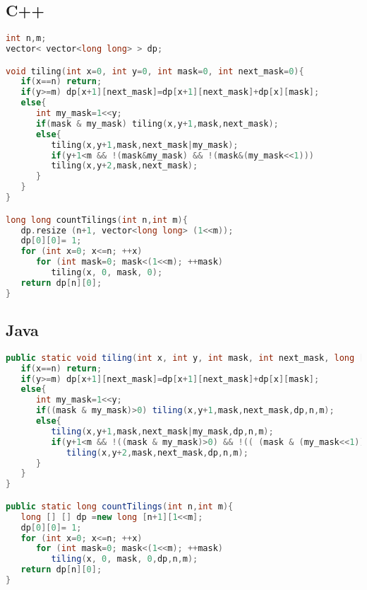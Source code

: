 \subsection{C++}
\begin{lstlisting}[language=C++]
int n,m;
vector< vector<long long> > dp;

void tiling(int x=0, int y=0, int mask=0, int next_mask=0){
   if(x==n) return;
   if(y>=m) dp[x+1][next_mask]=dp[x+1][next_mask]+dp[x][mask];
   else{
      int my_mask=1<<y;
      if(mask & my_mask) tiling(x,y+1,mask,next_mask);
      else{
         tiling(x,y+1,mask,next_mask|my_mask);
         if(y+1<m && !(mask&my_mask) && !(mask&(my_mask<<1)))
         tiling(x,y+2,mask,next_mask);
      }
   }
}

long long countTilings(int n,int m){
   dp.resize (n+1, vector<long long> (1<<m));
   dp[0][0]= 1;
   for (int x=0; x<=n; ++x)
      for (int mask=0; mask<(1<<m); ++mask)
         tiling(x, 0, mask, 0);
   return dp[n][0];
}
\end{lstlisting}
\subsection{Java}
\begin{lstlisting}[language=Java]
public static void tiling(int x, int y, int mask, int next_mask, long [] [] dp,int n,int m){
   if(x==n) return;
   if(y>=m) dp[x+1][next_mask]=dp[x+1][next_mask]+dp[x][mask];
   else{
      int my_mask=1<<y;
      if((mask & my_mask)>0) tiling(x,y+1,mask,next_mask,dp,n,m);
      else{
         tiling(x,y+1,mask,next_mask|my_mask,dp,n,m);
         if(y+1<m && !((mask & my_mask)>0) && !(( (mask & (my_mask<<1)) >0)))
            tiling(x,y+2,mask,next_mask,dp,n,m);
      }
   }
}

public static long countTilings(int n,int m){
   long [] [] dp =new long [n+1][1<<m];
   dp[0][0]= 1;
   for (int x=0; x<=n; ++x)
      for (int mask=0; mask<(1<<m); ++mask)
         tiling(x, 0, mask, 0,dp,n,m);
   return dp[n][0];
}
\end{lstlisting}